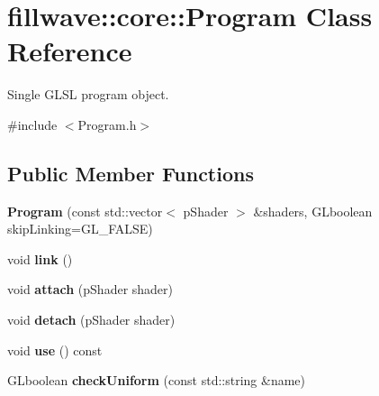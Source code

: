 \hypertarget{classfillwave_1_1core_1_1Program}{}\section{fillwave\+:\+:core\+:\+:Program Class Reference}
\label{classfillwave_1_1core_1_1Program}


Single G\+L\+S\+L program object.  




{\ttfamily \#include $<$Program.\+h$>$}

\subsection*{Public Member Functions}
\begin{DoxyCompactItemize}
\item 
\hypertarget{classfillwave_1_1core_1_1Program_a898aaa612c59cf431bdff562aa191c22}{}{\bfseries Program} (const std\+::vector$<$ p\+Shader $>$ \&shaders, G\+Lboolean skip\+Linking=G\+L\+\_\+\+F\+A\+L\+S\+E)\label{classfillwave_1_1core_1_1Program_a898aaa612c59cf431bdff562aa191c22}

\item 
\hypertarget{classfillwave_1_1core_1_1Program_a1790ef9a0f7abf5d3dcba6e3ce191f50}{}void {\bfseries link} ()\label{classfillwave_1_1core_1_1Program_a1790ef9a0f7abf5d3dcba6e3ce191f50}

\item 
\hypertarget{classfillwave_1_1core_1_1Program_ab167c340191ec67980ff36b7417055b6}{}void {\bfseries attach} (p\+Shader shader)\label{classfillwave_1_1core_1_1Program_ab167c340191ec67980ff36b7417055b6}

\item 
\hypertarget{classfillwave_1_1core_1_1Program_ac25f7b0664e9846c8aaa1346b58710c1}{}void {\bfseries detach} (p\+Shader shader)\label{classfillwave_1_1core_1_1Program_ac25f7b0664e9846c8aaa1346b58710c1}

\item 
\hypertarget{classfillwave_1_1core_1_1Program_ae1f5f39242ea75a450f66b1f053e77b3}{}void {\bfseries use} () const \label{classfillwave_1_1core_1_1Program_ae1f5f39242ea75a450f66b1f053e77b3}

\item 
\hypertarget{classfillwave_1_1core_1_1Program_a328d2854256bb8cf91544956613cd2e9}{}G\+Lboolean {\bfseries check\+Uniform} (const std\+::string \&name)\label{classfillwave_1_1core_1_1Program_a328d2854256bb8cf91544956613cd2e9}


\end{DoxyCompactItemize}
